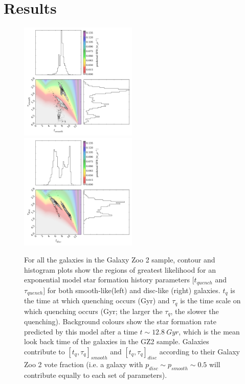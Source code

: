 \documentclass{mn2e}
\begin{document}
\section{Results}\label{results}

\begin{figure}
\includegraphics[width=0.4975\textwidth]{all_smooth.pdf}
\includegraphics[width=0.4975\textwidth]{all_disc.pdf}
\caption[8pt]{For all the galaxies in the Galaxy Zoo 2 sample, contour and histogram plots show the regions of greatest likelihood for an exponential model star formation history parameters $[t_{quench}$ and $\tau_{quench}]$ for both smooth-like(left) and disc-like (right) galaxies. $t_{q}$ is the time at which quenching occurs (Gyr) and $\tau_{q}$ is the time scale on which quenching occurs (Gyr; the larger the $\tau_{q}$, the slower the quenching). Background colours show the star formation rate predicted by this model after a time $t \sim 12.8~Gyr$, which is the mean look back time of the galaxies in the GZ2 sample. Galaxies contribute  to $[t_{q}, \tau_{q}]_{smooth}$ and $[t_{q}, \tau_{q}]_{disc}$ according to their Galaxy Zoo 2 vote fraction (i.e. a galaxy with $p_{disc} \sim p_{smooth} \sim 0.5$ will contribute equally to each set of parameters).}
\label{all}
\end{figure}
\end{document}
